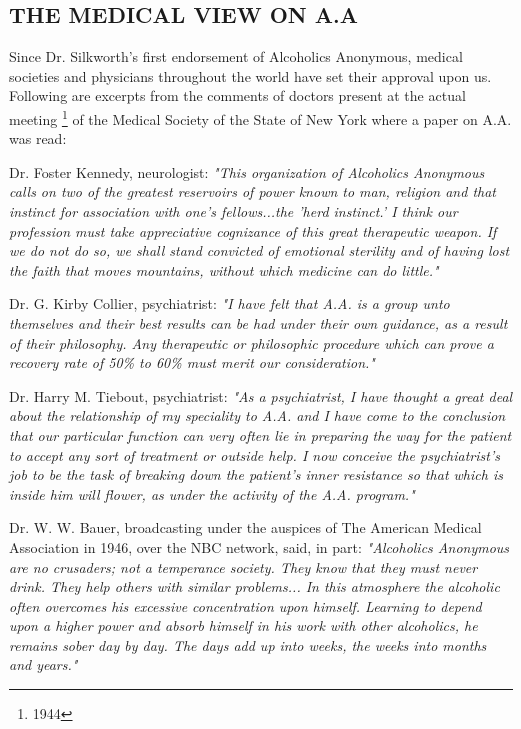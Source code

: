 

\subsection*{THE MEDICAL VIEW ON A.A}

\begin{biblechapter}
    Since Dr. Silkworth's first endorsement of Alcoholics Anonymous, 
    medical societies and physicians throughout the world 
    have set their approval upon us.
\verse Following are excerpts from the comments of doctors 
    present at the actual meeting
    \footnote[*]{1944}
    of the Medical Society 
    of the State of New York where a paper on A.A. was read:

    Dr. Foster Kennedy, neurologist: 
    \emph{"This organization of Alcoholics Anonymous 
    calls on two of the greatest reservoirs of power known to man, 
    religion and that instinct for association with one's fellows...the 
    'herd instinct.'
\verse I think our profession must take appreciative cognizance
    of this great therapeutic weapon.
\verse If we do not do so, 
    we shall stand convicted of emotional sterility 
    and of having lost the faith that moves mountains, 
    without which medicine can do little."
}

    Dr. G. Kirby Collier, psychiatrist: 
    \emph{"I have felt that A.A. is a group unto themselves 
        and their best results can be had under their own guidance, 
        as a result of their philosophy.
\verse Any therapeutic or philosophic procedure which can prove a recovery rate of 50\% to 60\% must merit our consideration."
}

    Dr. Harry M. Tiebout, psychiatrist: 
    \emph{"As a psychiatrist, 
    I have thought a great deal about the relationship 
    of my speciality to A.A. 
    and I have come to the conclusion that our particular function 
    can very often lie in preparing the way for the patient 
    to accept any sort of treatment or outside help.
\verse I now conceive the psychiatrist's job to be the task of 
    breaking down the patient's inner resistance 
    so that which is inside him will flower, 
    as under the activity of the A.A. program."
}
\end{biblechapter}
 
\begin{biblechapter}
    Dr. W. W. Bauer, 
    broadcasting under the auspices of The American Medical Association 
    in 1946, over the NBC network, said, in part: 
\verse\emph{ "Alcoholics Anonymous are no crusaders; 
    not a temperance society.  
\verse They know that they must never drink.
\verse They help others with similar problems... 
\verse In this atmosphere the alcoholic often overcomes 
    his excessive concentration upon himself.
\verse Learning to depend upon a higher power 
    and absorb himself in his work with other alcoholics, 
    he remains sober day by day.
\verse The days add up into weeks, the weeks into months and years."
}
\end{biblechapter}
 
